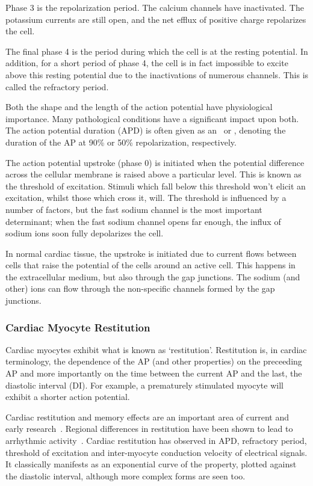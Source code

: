 Phase 3 is the repolarization period.
The calcium channels have inactivated.
The potassium currents are still open, and the net efflux of positive charge
repolarizes the cell.

The final phase 4 is the period during which the cell is at the resting
potential.
In addition, for a short period of phase 4, the cell is in fact
impossible to excite above this resting potential due to the inactivations of
numerous channels.
This is called the refractory period.

Both the shape and the length of the action potential have physiological
importance.
Many pathological conditions have a significant impact upon both.
The action potential duration (APD) is often given as an \apd\ or
\apd[50], denoting the duration of the AP at 90\% or 50\% repolarization,
respectively.

The action potential upstroke (phase 0) is initiated when the potential difference across
the cellular membrane is raised above a particular level.
This is known as the threshold of excitation.
Stimuli which fall below this threshold won't elicit an excitation, whilst those
which cross it, will.
The threshold is influenced by a number of factors, but the fast sodium channel
is the most important determinant; when the fast sodium channel opens far
enough, the influx of sodium ions soon fully depolarizes the cell.

In normal cardiac tissue, the upstroke is initiated due to current flows between
cells that raise the potential of the cells around an active cell.
This happens in the extracellular medium, but also through the gap
junctions.
The sodium (and other) ions can flow through the non-specific channels formed by
the gap junctions.

\subsubsection{Cardiac Myocyte Restitution}

Cardiac myocytes exhibit what is known as `restitution'.
Restitution is, in cardiac terminology, the dependence of the AP (and other
properties) on the preceeding AP and more importantly on the time between the
current AP and the last, the diastolic interval (DI).
For example, a prematurely stimulated myocyte will exhibit a shorter action
potential.

Cardiac restitution and memory effects are an important area of current and
early research~\cite{Boyett1978,Cherry2004,Clayton2005,Cherry2008,Goldhaber2005,Koller1998}.
Regional differences in restitution have been shown to lead to arrhythmic
activity~\cite{Clayton2005}.
Cardiac restitution has observed in APD, refractory period, threshold of
excitation and inter-myocyte conduction velocity of electrical signals.
It classically manifests as an exponential curve of the property, plotted
against the diastolic interval, although more complex forms are seen too.

